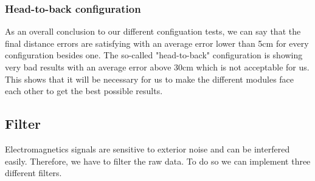 \subsubsection{Head-to-back configuration}
\begin{figure}[H]
  \centering
  \begin{minipage}[c]{0.38\textwidth}
    \centering
    \resizebox{\linewidth}{!}{\FtB}
  \end{minipage}\hfill
  \begin{minipage}[c]{0.58\textwidth}
    \centering
    \footnotesize
    \setlength{\tabcolsep}{3pt}
  \end{minipage}
\end{figure}

As an overall conclusion to our different configuation tests, we can say that the final distance errors are satisfying with an average error lower than 5cm for every configuration besides one. The so-called "head-to-back" configuration is showing very bad results with an average error above 30cm which is not acceptable for us. This shows that it will be necessary for us to make the different modules face each other to get the best possible results. 

\newpage
\subsection{Filter}
Electromagnetics signals are sensitive to exterior noise and can be interfered easily. Therefore, we have to filter the raw data. To do so we can implement three different filters.

